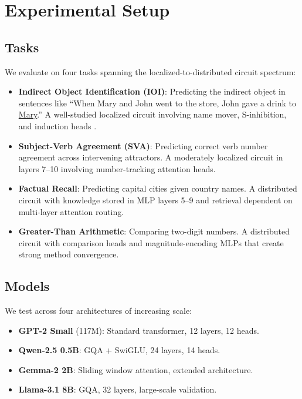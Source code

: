 \documentclass[11pt]{article}
\begin{document}
\section{Experimental Setup}
\label{sec:setup}

\subsection{Tasks}

We evaluate on four tasks spanning the localized-to-distributed circuit spectrum:

\begin{itemize}
    \item \textbf{Indirect Object Identification (IOI)}: Predicting the indirect object in sentences like ``When Mary and John went to the store, John gave a drink to \underline{Mary}.'' A well-studied localized circuit involving name mover, S-inhibition, and induction heads \citep{wang2023interpretability}.
    \item \textbf{Subject-Verb Agreement (SVA)}: Predicting correct verb number agreement across intervening attractors. A moderately localized circuit in layers 7--10 involving number-tracking attention heads.
    \item \textbf{Factual Recall}: Predicting capital cities given country names. A distributed circuit with knowledge stored in MLP layers 5--9 and retrieval dependent on multi-layer attention routing.
    \item \textbf{Greater-Than Arithmetic}: Comparing two-digit numbers. A distributed circuit with comparison heads and magnitude-encoding MLPs that create strong method convergence.
\end{itemize}

\subsection{Models}

We test across four architectures of increasing scale:
\begin{itemize}
    \item \textbf{GPT-2 Small} (117M): Standard transformer, 12 layers, 12 heads.
    \item \textbf{Qwen-2.5 0.5B}: GQA + SwiGLU, 24 layers, 14 heads.
    \item \textbf{Gemma-2 2B}: Sliding window attention, extended architecture.
    \item \textbf{Llama-3.1 8B}: GQA, 32 layers, large-scale validation.
\end{itemize}
\end{document}
